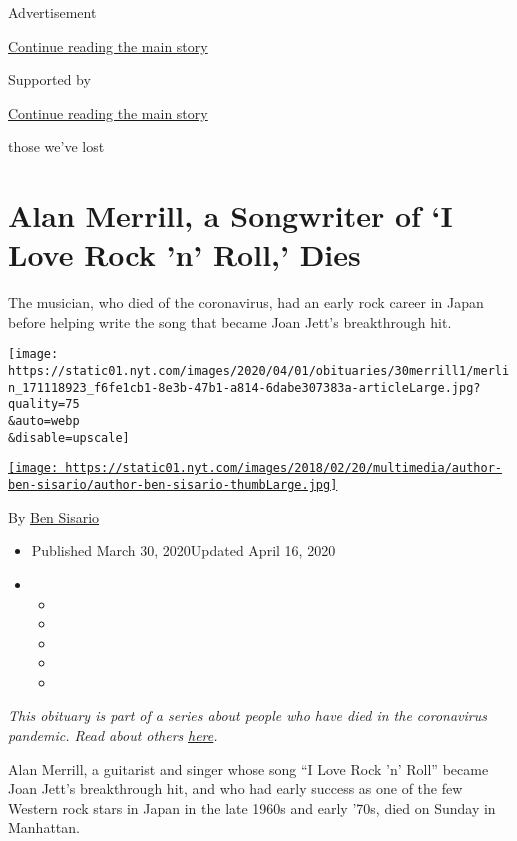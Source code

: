 Advertisement

\protect\hyperlink{after-top}{Continue reading the main story}

Supported by

\protect\hyperlink{after-sponsor}{Continue reading the main story}

those we've lost

\hypertarget{alan-merrill-a-songwriter-of-i-love-rock-n-roll-dies}{%
\section{Alan Merrill, a Songwriter of `I Love Rock 'n' Roll,'
Dies}\label{alan-merrill-a-songwriter-of-i-love-rock-n-roll-dies}}

The musician, who died of the coronavirus, had an early rock career in
Japan before helping write the song that became Joan Jett's breakthrough
hit.

\texttt{[image: https://static01.nyt.com/images/2020/04/01/obituaries/30merrill1/merlin\_171118923\_f6fe1cb1-8e3b-47b1-a814-6dabe307383a-articleLarge.jpg?quality=75\\\&auto=webp\\\&disable=upscale]}

\href{https://www.nytimes.com/by/ben-sisario}{\texttt{[image: https://static01.nyt.com/images/2018/02/20/multimedia/author-ben-sisario/author-ben-sisario-thumbLarge.jpg]}}

By \href{https://www.nytimes.com/by/ben-sisario}{Ben Sisario}

\begin{itemize}
\item
  Published March 30, 2020Updated April 16, 2020
\item
  \begin{itemize}
  \item
  \item
  \item
  \item
  \item
  \end{itemize}
\end{itemize}

\emph{This obituary is part of a series about people who have died in
the coronavirus pandemic. Read about others}
\href{https://www.nytimes.com/series/people-who-have-died-of-the-coronavirus}{\emph{here}}\emph{.}

Alan Merrill, a guitarist and singer whose song ``I Love Rock 'n' Roll''
became Joan Jett's breakthrough hit, and who had early success as one of
the few Western rock stars in Japan in the late 1960s and early '70s,
died on Sunday in Manhattan.

